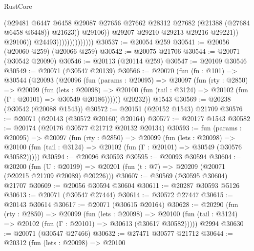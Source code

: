 \begin{lexlean}{RustCore}
\begin{coremodule}
                                              (@29481
                                                @6447
                                                @6458
                                                @29087
                                                @27656
                                                @27662
                                                @28312
                                                @27682
                                                (@21388 (@27684 @6458 @6448))
                                                @21623))
                                            @29106))
                                        @29207
                                        @29210
                                        @29213
                                        @29216
                                        @29221))
                                    @29106))
                                @24493))))))))))))))
@30537 := @20054 @259
@30541 := @20056 (@20060 @259) (@20066 @259)
@30542 := @20075 @21706
@30544 := @20071 (@30542 @20090)
@30546 := @20113 (@20114 @259)
@30547 := @20109 @30546
@30549 := @20071 (@30547 @20139)
@30566 := @20070
    (fun (fn : @101) =>
    @30544
      (@20093
        (@20096
          (fun (params : @20095) =>
          @20097
            (fun (rty : @2850) =>
            @20099
              (fun (lets : @20098) =>
              @20100 (fun (tail : @3124) => @20102 (fun (Γ : @20101) => @30549 @20186))))))
        @20232))
    @1543
@30569 := @20238 (@30542 (@20088 @1543))
@30572 := @20151 (@20152 @1543) @21709
@30576 := @20071 (@20143 (@30572 @20160) @20164)
@30577 := @20177 @1543
@30582 := @20174 (@20176 @30577 @21712 @20132 @20134)
@30593 := fun (params : @20095) =>
  @20097
    (fun (rty : @2850) =>
    @20099
      (fun (lets : @20098) =>
      @20100 (fun (tail : @3124) => @20102 (fun (Γ : @20101) => @30549 (@30576 @30582)))))
@30594 := @20096 @30593
@30595 := @20093 @30594
@30604 := @20200
    (fun (U : @20199) => @20201 (fun (t : @7) => @20209 (@20071 (@20215 @21709 @20089) @20226)))
@30607 := @30569 (@30595 @30604) @21707
@30609 := @20056 @30594 @30604
@30611 := @20287 @30593 @5126
@30613 := @20071 (@30547 @27444)
@30614 := @30572 @27447
@30615 := @20143 @30614
@30617 := @20071 (@30615 @20164)
@30628 := @20290
    (fun (rty : @2850) =>
    @20099
      (fun (lets : @20098) =>
      @20100 (fun (tail : @3124) => @20102 (fun (Γ : @20101) => @30613 (@30617 @30582)))))
    @2994
@30630 := @20071 (@30547 @27466)
@30632 := @27471 @30577 @21712
@30644 := @20312
    (fun (lets : @20098) =>
    @20100

\end{coremodule}
\end{lexlean}
